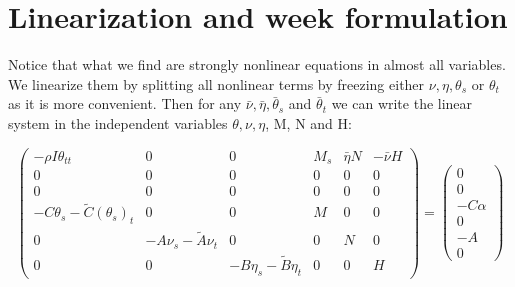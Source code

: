 
\usepackage{pdfsync}
\usepackage{amsmath}
\usepackage{graphicx}

\section{Linearization and week formulation}

Notice that what we find are strongly nonlinear equations in almost all variables.
We linearize them by splitting all nonlinear terms by freezing either $\nu, \eta, \theta_s$ or $\theta_t$ as it is more convenient. Then for any $\bar{\nu}, \bar{\eta}, \bar{\theta}_s$ and $\bar{\theta}_t$ we can write the linear system in the independent variables $\theta, \nu, \eta$, M, N and H:

\[\begin{pmatrix}
-\rho I \theta_{tt} & 0 & 0 & M_s & \bar{\eta}N & -\bar{\nu}H \\
0 & 0 & 0 & 0 & 0 & 0 \\
0 & 0 & 0 & 0 & 0 & 0 \\
-C\theta_s -\tilde{C}(\theta_s)_t& 0 & 0 & M & 0 & 0 \\
0 & -A\nu_s -\tilde{A}\nu_t & 0 & 0 & N & 0 \\
0 & 0 & -B\eta_s - \tilde{B}\eta_t & 0 & 0 & H 
\end{pmatrix}
=
\begin{pmatrix}
0\\
0\\
-C\alpha\\
0\\
-A\\
0
\end{pmatrix}\]


